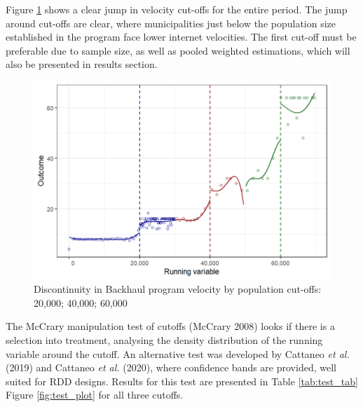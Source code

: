 \documentclass[
  12pt,
]{article}
\begin{document}
Figure \ref{fig:2} shows a clear jump in velocity cut-offs for the
entire period. The jump around cut-offs are clear, where municipalities
just below the population size established in the program face lower
internet velocities. The first cut-off must be preferable due to sample
size, as well as pooled weighted estimations, which will also be
presented in results section.

\begin{figure}
\centering
\includegraphics{artigo1_files/figure-latex/discontinuity-1.png}
\caption{Discontinuity in Backhaul program velocity by population
cut-offs: 20,000; 40,000; 60,000 \label{fig:2}}
\end{figure}

The McCrary manipulation test of cutoffs (McCrary 2008) looks if there
is a selection into treatment, analysing the density distribution of the
running variable around the cutoff. An alternative test was developed by
Cattaneo \emph{et al.} (2019) and Cattaneo \emph{et al.} (2020), where
confidence bands are provided, well suited for RDD designs. Results for
this test are presented in Table \ref{tab:test_tab} Figure
\ref{fig:test_plot} for all three cutoffs.
\end{document}
